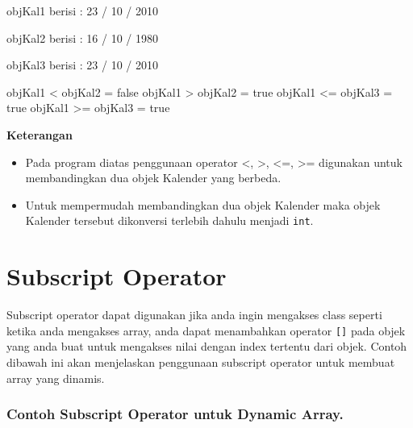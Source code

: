 \begin{lcverbatim}
objKal1 berisi :
23 / 10 / 2010

objKal2 berisi :
16 / 10 / 1980

objKal3 berisi :
23 / 10 / 2010

objKal1 < objKal2 = false
objKal1 > objKal2 = true
objKal1 <= objKal3 = true
objKal1 >= objKal3 = true
\end{lcverbatim}

\textbf{Keterangan}

\begin{itemize}

\item
  Pada program diatas penggunaan operator \textless{}, \textgreater{},
  \textless{}=, \textgreater{}= digunakan untuk membandingkan dua objek
  Kalender yang berbeda.
\item
  Untuk mempermudah membandingkan dua objek Kalender maka objek Kalender
  tersebut dikonversi terlebih dahulu menjadi \texttt{int}.
\end{itemize}

\section{Subscript Operator}\label{subscript-operator}

Subscript operator dapat digunakan jika anda ingin mengakses class
seperti ketika anda mengakses array, anda dapat menambahkan operator
\texttt{{[}{]}} pada objek yang anda buat untuk mengakses nilai dengan
index tertentu dari objek. Contoh dibawah ini akan menjelaskan
penggunaan subscript operator untuk membuat array yang dinamis.

\subsubsection*{Contoh  Subscript Operator untuk Dynamic Array.}

